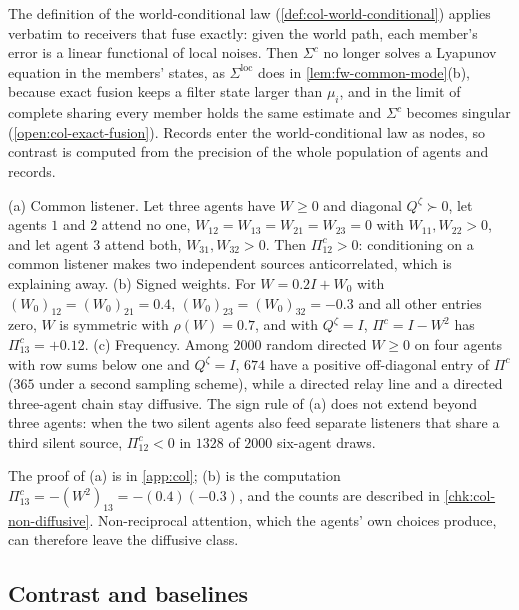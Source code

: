 \begin{remark}\label{rem:col-world-conditional}
The definition of the world-conditional law (\cref{def:col-world-conditional}) applies verbatim to receivers that fuse exactly: given the world path, each member's error is a linear functional of local noises. Then $\Sigma^c$ no longer solves a Lyapunov equation in the members' states, as $\Sigma^{\mathrm{loc}}$ does in \cref{lem:fw-common-mode}(b), because exact fusion keeps a filter state larger than $\mu_i$, and in the limit of complete sharing every member holds the same estimate and $\Sigma^c$ becomes singular (\cref{open:col-exact-fusion}). Records enter the world-conditional law as nodes, so contrast is computed from the precision of the whole population of agents and records.
\end{remark}

\begin{example}\label{ex:col-non-diffusive}
(a) Common listener. Let three agents have $W\ge0$ and diagonal $Q^{\zeta}\succ0$, let agents $1$ and $2$ attend no one, $W_{12}=W_{13}=W_{21}=W_{23}=0$ with $W_{11},W_{22}>0$, and let agent $3$ attend both, $W_{31},W_{32}>0$. Then $\Pi^c_{12}>0$: conditioning on a common listener makes two independent sources anticorrelated, which is explaining away. (b) Signed weights. For $W=0.2I+W_0$ with $(W_0)_{12}=(W_0)_{21}=0.4$, $(W_0)_{23}=(W_0)_{32}=-0.3$ and all other entries zero, $W$ is symmetric with $\rho(W)=0.7$, and with $Q^{\zeta}=I$, $\Pi^c=I-W^2$ has $\Pi^c_{13}=+0.12$. (c) Frequency. Among $2000$ random directed $W\ge0$ on four agents with row sums below one and $Q^{\zeta}=I$, $674$ have a positive off-diagonal entry of $\Pi^c$ ($365$ under a second sampling scheme), while a directed relay line and a directed three-agent chain stay diffusive. The sign rule of (a) does not extend beyond three agents: when the two silent agents also feed separate listeners that share a third silent source, $\Pi^c_{12}<0$ in $1328$ of $2000$ six-agent draws.
\end{example}
The proof of (a) is in \cref{app:col}; (b) is the computation $\Pi^c_{13}=-(W^2)_{13}=-(0.4)(-0.3)$, and the counts are described in \cref{chk:col-non-diffusive}. Non-reciprocal attention, which the agents' own choices produce, can therefore leave the diffusive class.

\subsection{Contrast and baselines}\label{sup:col-contrast-and-baselines}

